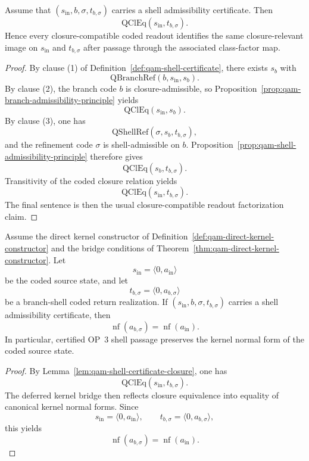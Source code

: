 \begin{lemma}\label{lem:qam-shell-certificate-closure}
Assume that $(s_{\mathrm{in}},b,\sigma,t_{b,\sigma})$ carries a shell admissibility certificate. Then
\[
\mathrm{QClEq}(s_{\mathrm{in}},t_{b,\sigma}).
\]
Hence every closure-compatible coded readout identifies the same closure-relevant image on $s_{\mathrm{in}}$ and $t_{b,\sigma}$ after passage through the associated class-factor map.
\end{lemma}

\begin{proof}
By clause (1) of Definition~\ref{def:qam-shell-certificate}, there exists $s_b$ with
\[
\mathrm{QBranchRef}(b,s_{\mathrm{in}},s_b).
\]
By clause (2), the branch code $b$ is closure-admissible, so Proposition~\ref{prop:qam-branch-admissibility-principle} yields
\[
\mathrm{QClEq}(s_{\mathrm{in}},s_b).
\]
By clause (3), one has
\[
\mathrm{QShellRef}(\sigma,s_b,t_{b,\sigma}),
\]
and the refinement code $\sigma$ is shell-admissible on $b$. Proposition~\ref{prop:qam-shell-admissibility-principle} therefore gives
\[
\mathrm{QClEq}(s_b,t_{b,\sigma}).
\]
Transitivity of the coded closure relation yields
\[
\mathrm{QClEq}(s_{\mathrm{in}},t_{b,\sigma}).
\]
The final sentence is then the usual closure-compatible readout factorization claim.
\end{proof}

\begin{proposition}\label{prop:qam-shell-certificate-kernel}
Assume the direct kernel constructor of Definition~\ref{def:qam-direct-kernel-constructor} and the bridge conditions of Theorem~\ref{thm:qam-direct-kernel-constructor}. Let
\[
s_{\mathrm{in}}=\langle 0,a_{\mathrm{in}}\rangle
\]
be the coded source state, and let
\[
t_{b,\sigma}=\langle 0,a_{b,\sigma}\rangle
\]
be a branch-shell coded return realization. If $(s_{\mathrm{in}},b,\sigma,t_{b,\sigma})$ carries a shell admissibility certificate, then
\[
\operatorname{nf}(a_{b,\sigma})=\operatorname{nf}(a_{\mathrm{in}}).
\]
In particular, certified OP~3 shell passage preserves the kernel normal form of the coded source state.
\end{proposition}

\begin{proof}
By Lemma~\ref{lem:qam-shell-certificate-closure}, one has
\[
\mathrm{QClEq}(s_{\mathrm{in}},t_{b,\sigma}).
\]
The deferred kernel bridge then reflects closure equivalence into equality of canonical kernel normal forms. Since
\[
s_{\mathrm{in}}=\langle 0,a_{\mathrm{in}}\rangle,
\qquad
 t_{b,\sigma}=\langle 0,a_{b,\sigma}\rangle,
\]
this yields
\[
\operatorname{nf}(a_{b,\sigma})=\operatorname{nf}(a_{\mathrm{in}}).
\]
\end{proof}


